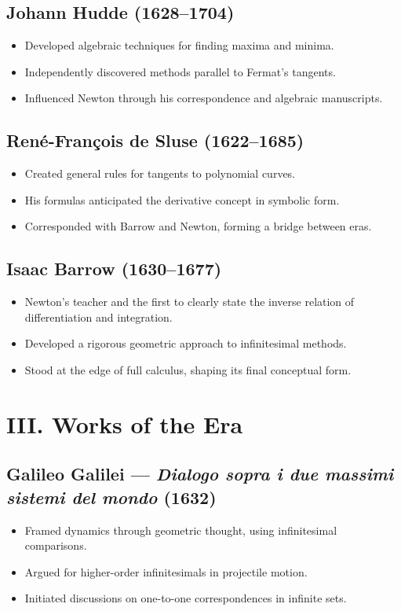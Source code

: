 \documentclass[9pt]{article}
\begin{document}
\subsection*{Johann Hudde (1628–1704)}
\begin{itemize}
  \item Developed algebraic techniques for finding maxima and minima.
  \item Independently discovered methods parallel to Fermat’s tangents.
  \item Influenced Newton through his correspondence and algebraic manuscripts.
\end{itemize}

\subsection*{René-François de Sluse (1622–1685)}
\begin{itemize}
  \item Created general rules for tangents to polynomial curves.
  \item His formulas anticipated the derivative concept in symbolic form.
  \item Corresponded with Barrow and Newton, forming a bridge between eras.
\end{itemize}

\subsection*{Isaac Barrow (1630–1677)}
\begin{itemize}
  \item Newton’s teacher and the first to clearly state the inverse relation of differentiation and integration.
  \item Developed a rigorous geometric approach to infinitesimal methods.
  \item Stood at the edge of full calculus, shaping its final conceptual form.
\end{itemize}

\newpage

\section*{III. Works of the Era}

\subsection*{Galileo Galilei — \textit{Dialogo sopra i due massimi sistemi del mondo} (1632)}
\begin{itemize}
  \item Framed dynamics through geometric thought, using infinitesimal comparisons.
  \item Argued for higher-order infinitesimals in projectile motion.
  \item Initiated discussions on one-to-one correspondences in infinite sets.
\end{itemize}
\end{document}
